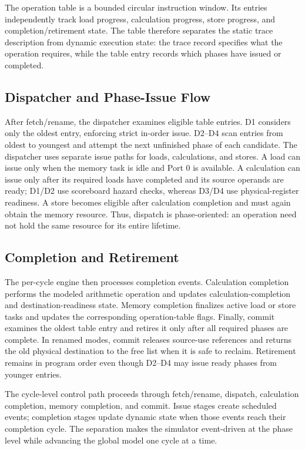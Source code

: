 \documentclass[conference]{IEEEtran}
\begin{document}
The operation table is a bounded circular instruction window. Its entries independently track load progress, calculation progress, store progress, and completion/retirement state. The table therefore separates the static trace description from dynamic execution state: the trace record specifies what the operation requires, while the table entry records which phases have issued or completed.

\subsection{Dispatcher and Phase-Issue Flow}
After fetch/rename, the dispatcher examines eligible table entries. D1 considers only the oldest entry, enforcing strict in-order issue. D2--D4 scan entries from oldest to youngest and attempt the next unfinished phase of each candidate. The dispatcher uses separate issue paths for loads, calculations, and stores. A load can issue only when the memory task is idle and Port 0 is available. A calculation can issue only after its required loads have completed and its source operands are ready; D1/D2 use scoreboard hazard checks, whereas D3/D4 use physical-register readiness. A store becomes eligible after calculation completion and must again obtain the memory resource. Thus, dispatch is phase-oriented: an operation need not hold the same resource for its entire lifetime.

\subsection{Completion and Retirement}
The per-cycle engine then processes completion events. Calculation completion performs the modeled arithmetic operation and updates calculation-completion and destination-readiness state. Memory completion finalizes active load or store tasks and updates the corresponding operation-table flags. Finally, commit examines the oldest table entry and retires it only after all required phases are complete. In renamed modes, commit releases source-use references and returns the old physical destination to the free list when it is safe to reclaim. Retirement remains in program order even though D2--D4 may issue ready phases from younger entries.

The cycle-level control path proceeds through fetch/rename, dispatch, calculation completion, memory completion, and commit. Issue stages create scheduled events; completion stages update dynamic state when those events reach their completion cycle. The separation makes the simulator event-driven at the phase level while advancing the global model one cycle at a time.
\end{document}
